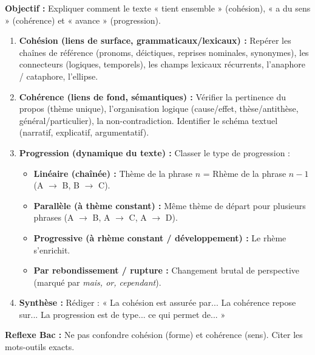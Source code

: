 \documentclass[11pt]{article}
\newcommand{\cle}[1]{{\popxbold\color{popdark}#1}}
\begin{document}
\begin{methode}
    \textbf{Objectif :} Expliquer comment le texte « tient ensemble » (cohésion), « a du sens » (cohérence) et « avance » (progression).
    \begin{enumerate}
        \item \textbf{Cohésion (liens de surface, grammaticaux/lexicaux) :} Repérer les \cle{chaînes de référence} (pronoms, déictiques, reprises nominales, synonymes), les \cle{connecteurs} (logiques, temporels), les \cle{champs lexicaux} récurrents, l'\cle{anaphore} / \cle{cataphore}, l'\cle{ellipse}.
        \item \textbf{Cohérence (liens de fond, sémantiques) :} Vérifier la \cle{pertinence} du propos (thème unique), l'\cle{organisation logique} (cause/effet, thèse/antithèse, général/particulier), la \cle{non-contradiction}. Identifier le \cle{schéma textuel} (narratif, explicatif, argumentatif).
        \item \textbf{Progression (dynamique du texte) :} Classer le type de progression :
            \begin{itemize}
                \item \textbf{Linéaire (chaînée) :} Thème de la phrase $n$ = Rhème de la phrase $n-1$ (A $\rightarrow$ B, B $\rightarrow$ C).
                \item \textbf{Parallèle (à thème constant) :} Même thème de départ pour plusieurs phrases (A $\rightarrow$ B, A $\rightarrow$ C, A $\rightarrow$ D).
                \item \textbf{Progressive (à rhème constant / développement) :} Le rhème s'enrichit.
                \item \textbf{Par rebondissement / rupture :} Changement brutal de perspective (marqué par \emph{mais, or, cependant}).
            \end{itemize}
        \item \textbf{Synthèse :} Rédiger : « La cohésion est assurée par... La cohérence repose sur... La progression est de type... ce qui permet de... »
    \end{enumerate}
    \textbf{Reflexe Bac :} Ne pas confondre cohésion (forme) et cohérence (sens). Citer les mots-outils exacts.
\end{methode}
\end{document}
